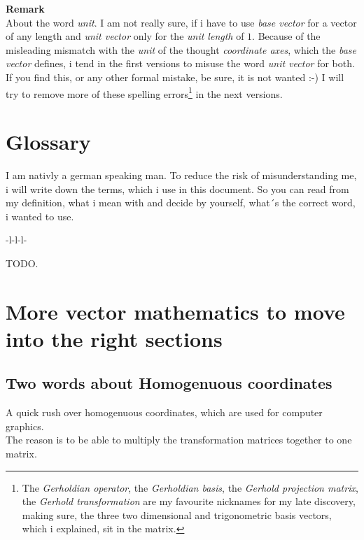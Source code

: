 \documentclass[a4paper]{article}
\begin{document}
\begin{Example}
\textbf{Remark}\\
About the word \emph{unit}. I am not really sure, if i have to use \emph{base vector} for a vector of any length and \emph{unit vector} only for the \emph{unit length} of $1$. Because of the misleading mismatch with the \emph{unit} of the thought \emph{coordinate axes}, which the \emph{base vector} defines, i tend in the first versions to misuse the word \emph{unit vector} for both. If you find this, or any other formal mistake, be sure, it is not wanted :-) I will try to remove more of these spelling errors\footnote{The \emph{Gerholdian operator}, the \emph{Gerholdian basis}, the \emph{Gerhold projection matrix}, the \emph{Gerhold transformation} are my favourite nicknames for my late discovery, making sure, the three two dimensional and trigonometric basis vectors, which i explained, sit in the matrix.} in the next versions.
\section{Glossary}

I am nativly a german speaking man. To reduce the risk of misunderstanding me, i will write down the terms, which i use in this document. So you can read from my definition, what i mean with and decide by yourself, what´s the correct word, i wanted to use.\\



\begin{tabular}{-l-l-l-}

\end{tabular}

TODO.

\appendix

\section{More vector mathematics to move into the right sections}

\subsection{Two words about Homogenuous coordinates}

A quick rush over homogenuous coordinates, which are used for computer graphics.\\

The reason is to be able to multiply the transformation matrices together to one matrix.\\


\end{Example}
\end{document}
